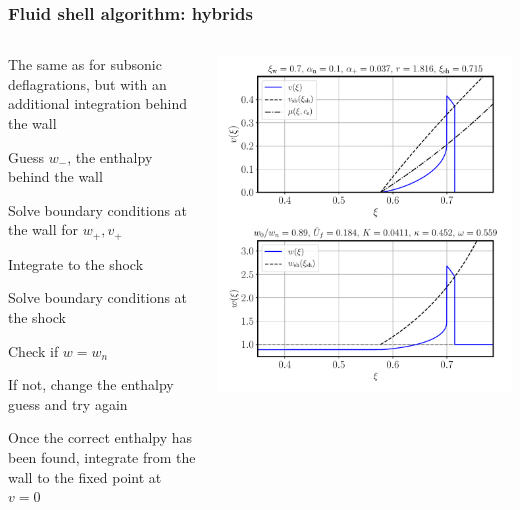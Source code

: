 \begin{frame}
    \frametitle{Fluid shell algorithm: hybrids}
    \begin{columns}
    \begin{column}{0.6\textwidth}
        \begin{itemize}
                \item The same as for subsonic deflagrations, but with an additional integration behind the wall
                { \color{gray}
                \item Guess $w_-$, the enthalpy behind the wall
                \item Solve boundary conditions at the wall for $w_+, v_+$
                \item Integrate to the shock
                \item Solve boundary conditions at the shock
                \item Check if $w=w_n$
                \item If not, change the enthalpy guess and try again
                }
                \item Once the correct enthalpy has been found, integrate from the wall to the fixed point at $v=0$
        \end{itemize}
    \end{column}
    \begin{column}{0.4\textwidth}
        \includegraphics[width=\textwidth]{../fig/shell_plot_vw_07_alphan_01_review}
    \end{column}
    \end{columns}
\end{frame}

